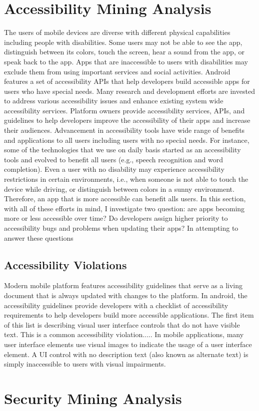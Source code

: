 \section{Accessibility Mining Analysis}
The users of mobile devices are diverse with different physical capabilities including people with disabilities.
Some users may not be able to see the app, distinguish between its colors, touch the screen, hear a sound from the app, or speak back to the app.
Apps that are inaccessible to users with disabilities may exclude them from using important services and social activities.
Android features a set of accessibility APIs that help developers build accessible apps for users who have special needs.
Many research and development efforts are invested to address various accessibility issues and enhance existing system wide accessibility services.
Platform owners provide accessibility services, APIs, and guidelines to help developers improve the accessibility of their apps and increase their audiences.
Advancement in accessibility tools have wide range of benefits and applications to all users including users with no special needs.
For instance, some of the technologies that we use on daily basis started as an accessibility tools and evolved to benefit all users (e.g., speech recognition and word completion).
Even a user with no disability may experience accessibility restrictions in certain environments, i.e., when someone is not able to touch the device while driving, or distinguish between colors in a sunny environment.
Therefore, an app that is more accessible can benefit alls users.
In this section, with all of these efforts in mind, I investigate two question: are apps becoming more or less accessible over time? Do developers assign higher priority to accessibility bugs and problems when updating their apps?
In attempting to answer these questions

\subsection{Accessibility Violations}
Modern mobile platform features accessibility guidelines that serve as a living document that is always updated with changes to the platform.
In android, the accessibility guidelines \cite{android_accessibility_guidelines} provide developers with a checklist of accessibility requirements \cite{android_accessibility_checklist} to help developers build more accessible applications.
The first item of this list is describing visual user interface controls that do not have visible text.
This is a common accessibility violation.....
In mobile applications, many user interface elements use visual images to indicate the usage of a user interface element.
A UI control with no description text (also known as alternate text) is simply inaccessible to users with visual impairments.



\section{Security Mining Analysis}
